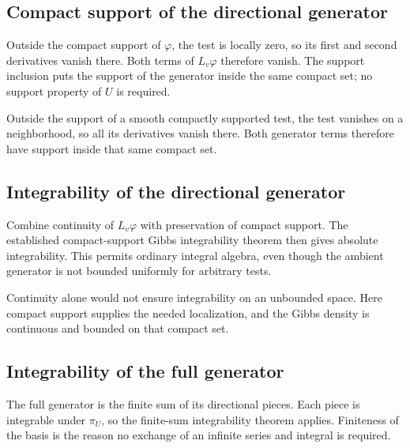 \documentclass[11pt,a4paper]{report}
\begin{document}
\subsection{\texorpdfstring{Compact support of the directional generator}{Compact support of the directional generator}}
\label{report-step-UnadjustedLangevin-Generator-lean-9}


Outside the compact support of \(\varphi\), the test is locally zero, so its first and second derivatives vanish there. Both terms of \(L_v\varphi\) therefore vanish. The support inclusion puts the support of the generator inside the same compact set; no support property of \(U\) is required.



Outside the support of a smooth compactly supported test, the test vanishes on a neighborhood, so all its derivatives vanish there. Both generator terms therefore have support inside that same compact set.

\subsection{\texorpdfstring{Integrability of the directional generator}{Integrability of the directional generator}}
\label{report-step-UnadjustedLangevin-Generator-lean-10}


Combine continuity of \(L_v\varphi\) with preservation of compact support. The established compact-support Gibbs integrability theorem then gives absolute integrability. This permits ordinary integral algebra, even though the ambient generator is not bounded uniformly for arbitrary tests.



Continuity alone would not ensure integrability on an unbounded space. Here compact support supplies the needed localization, and the Gibbs density is continuous and bounded on that compact set.

\subsection{\texorpdfstring{Integrability of the full generator}{Integrability of the full generator}}
\label{report-step-UnadjustedLangevin-Generator-lean-11}


The full generator is the finite sum of its directional pieces. Each piece is integrable under \(\pi_U\), so the finite-sum integrability theorem applies. Finiteness of the basis is the reason no exchange of an infinite series and integral is required.
\end{document}
